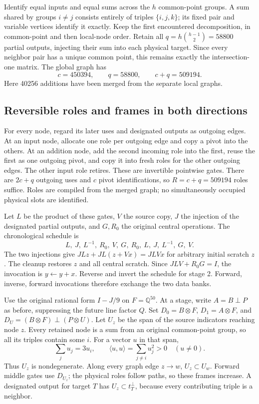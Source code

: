 Identify equal inputs and equal sums across the $h$ common-point groups.
A sum shared by groups $i\ne j$ consists entirely of triples $\{i,j,k\}$;
its fixed pair and variable vertices identify it exactly. Keep the first
encountered decomposition, in common-point and then local-node order. Retain
all $q=h\binom{h-1}{2}=58800$ partial outputs, injecting their sum into each
physical target. Since every neighbor pair has a unique common point, this
remains exactly the intersection-one matrix. The global graph has
\[
 c=450394,\qquad q=58800,\qquad c+q=509194.
\]
Here 40256 additions have been merged from the separate local graphs.

\subsection{Reversible roles and frames in both directions}
For every node, regard its later uses and designated outputs as outgoing edges.
At an input node, allocate one role per outgoing edge and copy a pivot into
the others. At an addition node, add the second incoming role into the first,
reuse the first as one outgoing pivot, and copy it into fresh roles for the
other outgoing edges. The other input role retires. These are invertible
pointwise gates. There are $2c+q$ outgoing uses and $c$ pivot identifications,
so $R=c+q=509194$ roles suffice. Roles are compiled from the merged graph;
no simultaneously occupied physical slots are identified.

Let $L$ be the product of these gates, $V$ the source copy, $J$ the injection
of the designated partial outputs, and $G,R_0$ the original central operations.
The chronological schedule is
\[
 L,\ J,\ L^{-1},\ R_0,\ V,\ G,\ R_0,\ L,\ J,\ L^{-1},\ G,\ V.
\]
The two injections give $JLz+JL(z+Vx)=JLVx$ for arbitrary initial scratch $z$.
The cleanup restores $z$ and all central scratch. Since $JLV+R_0G=I$,
the invocation is $y\gets y+x$. Reverse and invert the schedule for stage 2.
Forward, inverse, forward invocations therefore exchange the two data banks.

Use the original rational form $I-J/9$ on $F=\mathbb Q^{50}$. At a stage,
write $A=B\mathbin\perp P$ as before, suppressing the future line factor $Q$.
Set $D_0=B\otimes F$, $D_1=A\otimes F$, and
$D_U=(B\otimes F)\mathbin\perp(P\otimes U)$.
Let $U_z$ be the span of the source indicators reaching node $z$.
Every retained node is a sum from an original common-point group, so all its
triples contain some $i$. For a vector $u$ in that span,
\[
 \sum_j u_j=3u_i,\qquad
 \langle u,u\rangle=\sum_{j\ne i}u_j^2>0\quad(u\ne0).
\]
Thus $U_z$ is nondegenerate. Along every graph edge $z\to w$,
$U_z\subset U_w$. Forward middle gates use $D_{U_z}$; the physical roles
follow paths, so these frames increase. A designated output for target $T$
has $U_z\subset t_T^\perp$, because every contributing triple is a neighbor.

